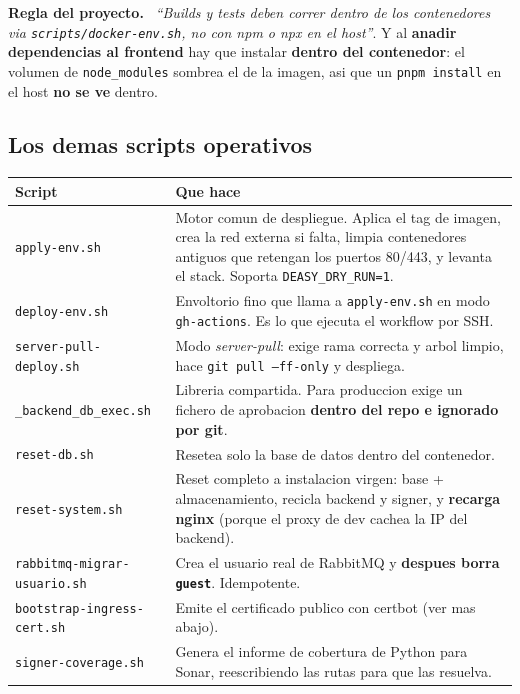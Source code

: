 \documentclass[11pt,a4paper,oneside]{report}
\newenvironment{aviso}[1][Aviso]{%
  \par\medskip
  \colorlet{shadecolor}{orange!14}%
  \begin{shaded}\noindent\textbf{\color{orange!45!black}#1.}\ \ignorespaces}%
  {\end{shaded}\par\medskip}
\newcommand{\rt}[1]{\texttt{#1}}
\begin{document}
\begin{aviso}[Regla del proyecto]
\emph{``Builds y tests deben correr dentro de los contenedores via \rt{scripts/docker-env.sh},
no con npm o npx en el host''}. Y al \textbf{anadir dependencias al frontend} hay que instalar
\textbf{dentro del contenedor}: el volumen de \rt{node\_modules} sombrea el de la imagen, asi
que un \rt{pnpm install} en el host \textbf{no se ve} dentro.
\end{aviso}

\subsection{Los demas scripts operativos}

\begin{center}
\footnotesize
\begin{tabularx}{\textwidth}{@{}P{4.4cm}L@{}}
\toprule
\textbf{Script} & \textbf{Que hace} \\
\midrule
\rt{apply-env.sh}       & Motor comun de despliegue. Aplica el tag de imagen, crea la red externa si falta, limpia contenedores antiguos que retengan los puertos 80/443, y levanta el stack. Soporta \rt{DEASY\_DRY\_RUN=1}. \\
\rt{deploy-env.sh}      & Envoltorio fino que llama a \rt{apply-env.sh} en modo \rt{gh-actions}. Es lo que ejecuta el workflow por SSH. \\
\rt{server-pull-deploy.sh} & Modo \emph{server-pull}: exige rama correcta y arbol limpio, hace \rt{git pull --ff-only} y despliega. \\
\rt{\_backend\_db\_exec.sh} & Libreria compartida. Para produccion exige un fichero de aprobacion \textbf{dentro del repo e ignorado por git}. \\
\rt{reset-db.sh}        & Resetea solo la base de datos dentro del contenedor. \\
\rt{reset-system.sh}    & Reset completo a instalacion virgen: base + almacenamiento, recicla backend y signer, y \textbf{recarga nginx} (porque el proxy de dev cachea la IP del backend). \\
\rt{rabbitmq-migrar-usuario.sh} & Crea el usuario real de RabbitMQ y \textbf{despues borra \rt{guest}}. Idempotente. \\
\rt{bootstrap-ingress-cert.sh} & Emite el certificado publico con certbot (ver mas abajo). \\
\rt{signer-coverage.sh} & Genera el informe de cobertura de Python para Sonar, reescribiendo las rutas para que las resuelva. \\
\bottomrule
\end{tabularx}
\end{center}
\end{document}
